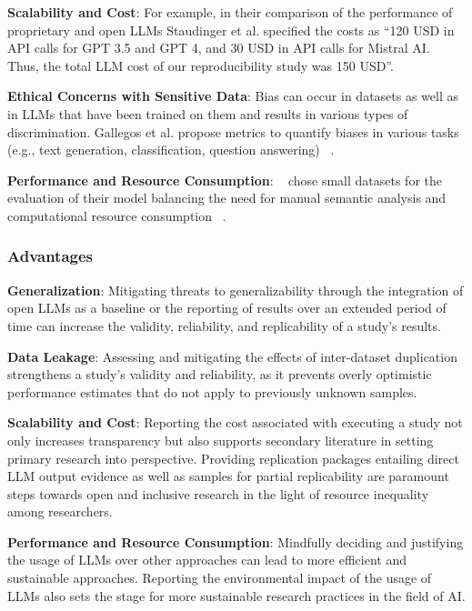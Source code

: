 \begin{itemize}
\textbf{Scalability and Cost}:
For example, in their comparison of the performance of proprietary and open LLMs Staudinger et al. specified the costs as \enquote{120 USD in API calls for GPT 3.5 and GPT 4, and 30 USD in API calls for Mistral AI. Thus, the total LLM cost of our reproducibility study was 150 USD}. ~\cite{DBLP:conf/sigir-ap/StaudingerKPLH24}

\textbf{Ethical Concerns with Sensitive Data}:
Bias can occur in datasets as well as in LLMs that have been trained on them and results in various types of discrimination. Gallegos et al. propose metrics to quantify biases in various tasks (e.g., text generation, classification, question answering) ~\cite{DBLP:journals/corr/abs-2309-00770}.

\textbf{Performance and Resource Consumption}:
~\cite{tinnessoftware} chose small datasets for the evaluation of their model balancing the need for manual semantic analysis and computational resource consumption ~\cite{tinnessoftware}.

\subsubsection{Advantages}
\textbf{Generalization}:
Mitigating threats to generalizability through the integration of open LLMs as a baseline or the reporting of results over an extended period of time can increase the validity, reliability, and replicability of a study's results.

\textbf{Data Leakage}:
Assessing and mitigating the effects of inter-dataset duplication strengthens a study's validity and reliability, as it prevents overly optimistic performance estimates that do not apply to previously unknown samples.

\textbf{Scalability and Cost}:
Reporting the cost associated with executing a study not only increases transparency but also supports secondary literature in setting primary research into perspective.
Providing replication packages entailing direct LLM output evidence as well as samples for partial replicability are paramount steps towards open and inclusive research in the light of resource inequality among researchers.

\textbf{Performance and Resource Consumption}:
Mindfully deciding and justifying the usage of LLMs over other approaches can lead to more efficient and sustainable approaches. 
Reporting the environmental impact of the usage of LLMs also sets the stage for more sustainable research practices in the field of AI.


\end{itemize}
